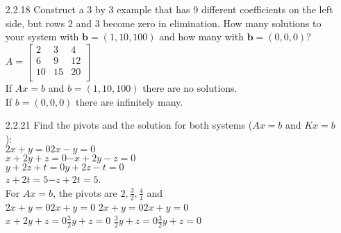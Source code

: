 \documentclass[10pt,twoside,reqno]{article}
\begin{document}
\begin{enumerate}
\item[2.2.18]Construct a 3 by 3 example that has 9 different coefficients on the left side, but rows 2 and 3 become zero in elimination. How many solutions to your system with $\pmb{b} = (1,10,100)$ and how many with $\pmb{b} = (0,0,0)$? \\
\vspace{3mm}
$
$$
A=
\begin{bmatrix}
2&3&4\\
6&9&12\\
10&15&20\\
\end{bmatrix}
$$
$\\
If $Ax = b$ and $b=(1, 10, 100)$ there are no solutions.\\
If $b = (0, 0, 0)$ there are infinitely many.\\
\item[2.2.21]Find the pivots and the solution for both systems ($Ax = b$ and $Kx = b$): \\
\hspace{122pt}$2x+ y      =0$\hspace{60pt}$2x- y      =0$\\
\hspace{105pt}$ x+2y+ z   =0$\hspace{35pt}$-x+2y- z   =0$\\
\hspace{107pt}$    y+2z+ t=0$\hspace{46pt}$    y+2z- t=0$\\
\hspace{125pt}$       z+2t=5$\hspace{55pt}$     - z+2t=5$.\\
\vspace{3mm}
For $Ax = b$, the pivots are $2, \frac{3}{2}, \frac{4}{4}$ and\\
\vspace{3mm}
\hspace{15pt}$2x+ y      =0$\hspace{35pt}$2x + y      =0$ \hspace{35pt}$2x+ y      =0$\hspace{35pt}$2x + y      =0$\\
\hspace{15pt}$ x+2y+ z   =0$\hspace{18pt}$\frac{3}{2}y + z   =0$ \hspace{35pt}$ \frac{3}{2}y + z   =0$\hspace{30pt}$\frac{3}{2}y + z   =0$\\

\end{enumerate}
\end{document}
